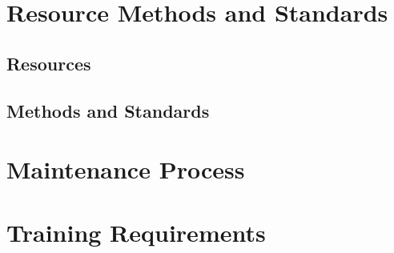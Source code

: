 \section{Resource Methods and Standards}

\subsection{Resources}
\subsection{Methods and Standards}


\section{Maintenance Process}

\section{Training Requirements}
